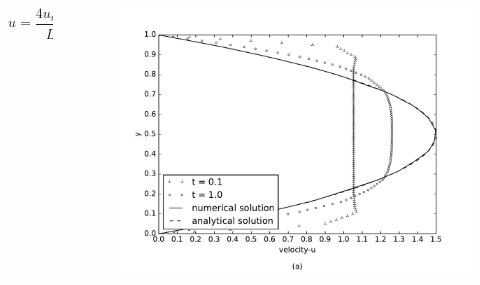 \begin{frame}
\begin{center}
\begin{columns}[c]
\begin{column}{0.35\textwidth}
\end{column}
\end{columns}
\end{center}
\vspace{-0.5cm}
\begin{center}
\begin{columns}[c]
\begin{column}{0.4\textwidth} 
\begin{equation*}
u = \frac{4 u_{max}}{L^2} y \big[ L - y \big]
\end{equation*}
\end{column}
\begin{column}{0.73\textwidth} 
\begin{figure}
  \centering
  \includegraphics[scale=0.48]{images/poiseuille_velocity.pdf}
\end{figure}
\end{column}
\end{columns}
\end{center}
\end{frame}
\fi



